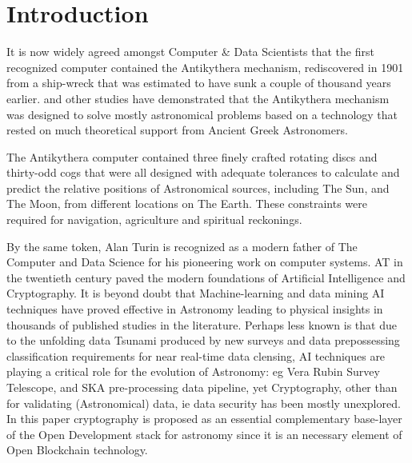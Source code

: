 \documentclass[final,5p,times,twocolumn,authoryear]{elsarticle}
\begin{document}
    

\section{Introduction}
\label{sec:intro}
%
 It is now widely agreed amongst Computer \& Data Scientists that the first recognized computer contained the Antikythera mechanism, rediscovered in 1901 from a ship-wreck that was estimated to have sunk a couple of thousand years earlier. \citep{Freeth2021} and other studies have demonstrated that the Antikythera mechanism was designed to solve mostly astronomical problems based on a technology that rested on much theoretical support from Ancient Greek Astronomers. 
 
 The Antikythera computer contained three finely crafted rotating discs and thirty-odd cogs that were all designed with adequate tolerances to calculate and predict the relative positions of Astronomical sources, including The Sun, and The Moon, from different locations on The Earth. These constraints were required for navigation, agriculture and spiritual reckonings. 
 
 By the same token, Alan Turin is recognized as a modern father of The Computer and Data Science for his pioneering work on computer systems. AT in the twentieth century paved the modern foundations of Artificial Intelligence and Cryptography. It is beyond doubt that Machine-learning and data mining AI techniques have proved effective in Astronomy leading to physical insights in thousands of published studies in the literature. Perhaps less known is that due to the unfolding data Tsunami produced by new surveys and data prepossessing classification requirements for near real-time data clensing, AI techniques are playing a critical role for the evolution of Astronomy: eg Vera Rubin Survey Telescope, and SKA pre-processing data pipeline, yet Cryptography, other than for validating (Astronomical) data, ie data security has been mostly unexplored. In this paper cryptography is proposed as an essential complementary base-layer of the Open Development stack for astronomy since it is an necessary element of Open Blockchain technology. 
\end{document}

